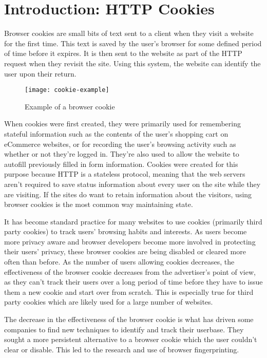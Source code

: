 \chapter{Introduction: HTTP Cookies}

Browser cookies are small bits of text sent to a client when they visit a website for the first time.
This text is saved by the user's browser for some defined period of time before it expires.
It is then sent to the website as part of the HTTP request when they revisit the site.
Using this system, the website can identify the user upon their return.

\begin{figure}[h]
\caption{Example of a browser cookie}
\texttt{[image: cookie-example]}
\centering
\end{figure}

When cookies were first created, they were primarily used for remembering stateful information such as the contents of the user's shopping cart on eCommerce websites, or for recording the user's browsing activity such as whether or not they're logged in.\cite{deconstructing-code}
They're also used to allow the website to autofill previously filled in form information.
Cookies were created for this purpose because HTTP is a stateless protocol, meaning that the web servers aren't required to save status information about every user on the site while they are visiting.
If the sites do want to retain information about the visitors, using browser cookies is the most common way maintaining state.

It has become standard practice for many websites to use cookies (primarily third party cookies) to track users' browsing habits and interests.
As users become more privacy aware and browser developers become more involved in protecting their users' privacy, these browser cookies are being disabled or cleared more often than before.
As the number of users allowing cookies decreases, the effectiveness of the browser cookie decreases from the advertiser's point of view, as they can't track their users over a long period of time before they have to issue them a new cookie and start over from scratch.
This is especially true for third party cookies which are likely used for a large number of websites.

The decrease in the effectiveness of the browser cookie is what has driven some companies to find new techniques to identify and track their userbase.
They sought a more persistent alternative to a browser cookie which the user couldn't clear or disable.
This led to the research and use of browser fingerprinting.

